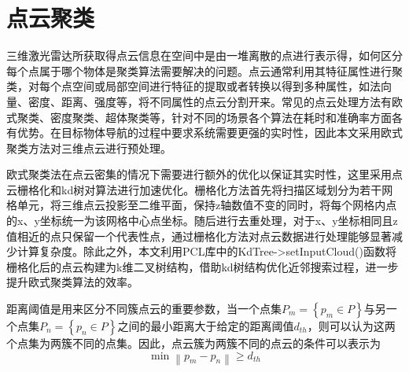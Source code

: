 \section{点云聚类}
三维激光雷达所获取得点云信息在空间中是由一堆离散的点进行表示得，如何区分每个点属于哪个物体是聚类算法需要解决的问题。点云通常利用其特征属性进行聚类，对每个点空间或局部空间进行特征的提取或者转换以得到多种属性，如法向量、密度、距离、强度等，将不同属性的点云分割开来\cite{himmelsbach2010fast}。常见的点云处理方法有欧式聚类、密度聚类、超体聚类等，针对不同的场景各个算法在耗时和准确率方面各有优势。在目标物体导航的过程中要求系统需要更强的实时性，因此本文采用欧式聚类\cite{liu2021point}方法对三维点云进行预处理。

欧式聚类法在点云密集的情况下需要进行额外的优化以保证其实时性，这里采用点云栅格化和kd树对算法进行加速优化\cite{guo2023kd}。栅格化方法首先将扫描区域划分为若干网格单元，将三维点云投影至二维平面，保持z轴数值不变的同时，将每个网格内点的x、y坐标统一为该网格中心点坐标。随后进行去重处理，对于x、y坐标相同且z值相近的点只保留一个代表性点，通过栅格化方法对点云数据进行处理能够显著减少计算复杂度。除此之外，本文利用PCL库中的KdTree->setInputCloud()函数将栅格化后的点云构建为k维二叉树结构，借助kd树结构优化近邻搜索过程，进一步提升欧式聚类算法的效率。

距离阈值是用来区分不同簇点云的重要参数，当一个点集${P_m} = \left\{ {{p_m} \in P} \right\}$与另一个点集${P_n} = \left\{ {{p_n} \in P} \right\}$之间的最小距离大于给定的距离阈值${d_{th}}$，则可以认为这两个点集为两簇不同的点集。因此，点云簇为两簇不同的点云的条件可以表示为
\begin{equation}
    \min \left\| {{p_m} - {p_n}} \right\| \ge {d_{th}}
    \label{myeq5}
\end{equation}

